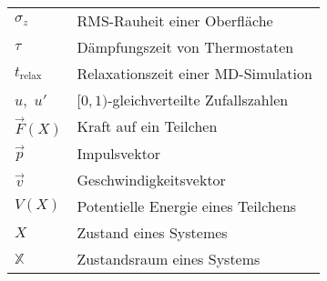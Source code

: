 \begin{tabular}{ll}
$\sigma_z$       & RMS-Rauheit einer Oberfläche                                 \\
$\tau$           & Dämpfungszeit von Thermostaten                               \\
$t_\text{relax}$ & Relaxationszeit einer MD-Simulation                          \\
$u$,~$u'$        & $[0,1)$-gleichverteilte Zufallszahlen                        \\
$\vec F(X)$      & Kraft auf ein Teilchen                                       \\
$\vec p$         & Impulsvektor                                                 \\
$\vec v$         & Geschwindigkeitsvektor                                       \\
$V(X)$           & Potentielle Energie eines Teilchens                          \\
$X$              & Zustand eines Systemes                                       \\
$\mathbb{X}$     & Zustandsraum eines Systems                                   \\
\end{tabular}


